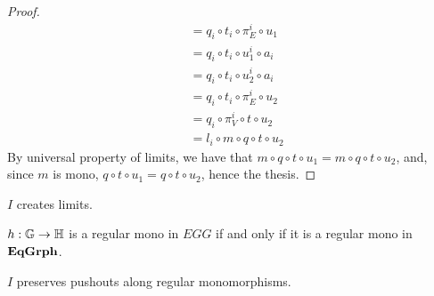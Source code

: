 \begin{proof}
\begin{align*}
							&= q_i \circ t_i \circ \pi_E^i \circ u_1 \\
							&= q_i \circ t_i \circ u_1^i \circ a_i \\
							&= q_i \circ t_i \circ u_2^i \circ a_i \\
							&= q_i \circ t_i \circ \pi_E^i \circ u_2 \\
							&= q_i \circ \pi_V^i \circ t \circ u_2 \\
							&= l_i \circ m \circ q \circ t \circ u_2
	\end{align*}
	By universal property of limits, we have that \- $m\circ q \circ t \circ u_1 = m \circ q \circ t \circ u_2$, and, since $m$ is mono, $q \circ t \circ u_1 = q \circ t \circ u_2$, hence the thesis.
\end{proof}

\begin{cor}\label{cor:I_creates_limits}
	$I$ creates limits.
\end{cor}

\begin{cor}\label{cor:reg_mono_EGG}
	$h: \mathbb{G \to H}$ is a regular mono in $EGG$ if and only if it is a regular mono in $\mathbf{EqGrph}$.
\end{cor}

\begin{lemma}\label{lem:I_pres_pushouts_of_monos}
	$I$ preserves pushouts along regular monomorphisms.	
\end{lemma}

